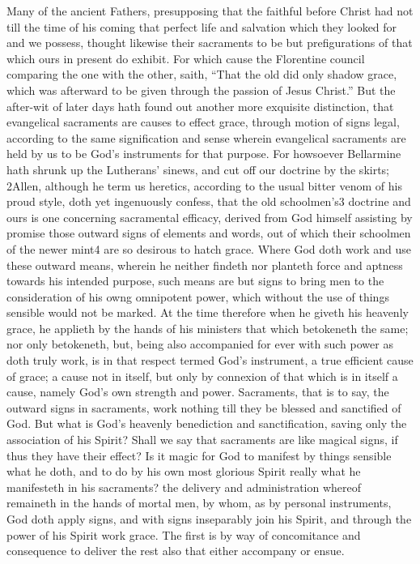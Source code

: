 Many of the ancient Fathers, presupposing that the faithful before Christ had not till the time of his coming that perfect life and salvation which they looked for and we possess, thought likewise their sacraments to be but prefigurations of that which ours in present do exhibit. For which cause the Florentine council comparing the one with the other, saith, “That the old did only shadow grace, which was afterward to be given through the passion of Jesus Christ.” But the after-wit of later days hath found out another more exquisite distinction, that evangelical sacraments are causes to effect grace, through motion of signs legal, according to the same signification and sense wherein evangelical sacraments are held by us to be God’s instruments for that purpose. For howsoever Bellarmine hath shrunk up the Lutherans’ sinews, and cut off our doctrine by the skirts; 2Allen, although he term us heretics, according to the usual bitter venom of his proud style, doth yet ingenuously confess, that the old schoolmen’s3 doctrine and ours is one concerning sacramental efficacy, derived from God himself assisting by promise those outward signs of elements and words, out of which their schoolmen of the newer mint4 are so desirous to hatch grace. Where God doth work and use these outward means, wherein he neither findeth nor planteth force and aptness towards his intended purpose, such means are but signs to bring men to  the consideration of his owng omnipotent power, which without the use of things sensible would not be marked. At the time therefore when he giveth his heavenly grace, he applieth by the hands of his ministers that which betokeneth the same; nor only betokeneth, but, being also accompanied for ever with such power as doth truly work, is in that respect termed God’s instrument, a true efficient cause of grace; a cause not in itself, but only by connexion of that which is in itself a cause, namely God’s own strength and power. Sacraments, that is to say, the outward signs in sacraments, work nothing till they be blessed and sanctified of God. But what is God’s heavenly benediction and sanctification, saving only the association of his Spirit? Shall we say that sacraments are like magical signs, if thus they have their effect? Is it magic for God to manifest by things sensible what he doth, and to do by his own most glorious Spirit really what he manifesteth in his sacraments? the delivery and administration whereof remaineth in the hands of mortal men, by whom, as by personal instruments, God doth apply signs, and with signs inseparably join his Spirit, and through the power of his Spirit work grace. The first is by way of concomitance and consequence to deliver the rest also that either accompany or ensue.

